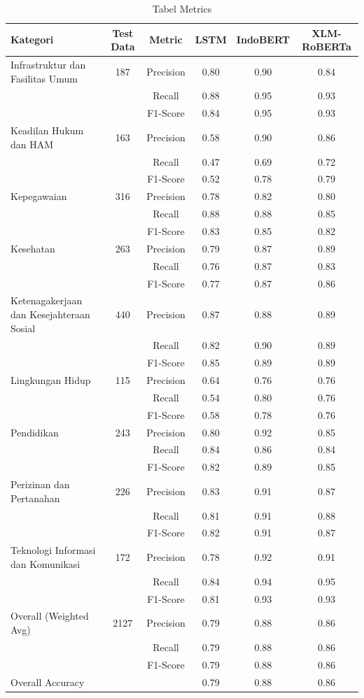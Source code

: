 \documentclass[12pt,a4paper]{article}
\begin{document}
\begin{table}[h!]
\centering
\scriptsize %
\begin{tabular}{|l|c|c|c|c|c|}
\hline
\textbf{Kategori} & \textbf{Test Data} & \textbf{Metric} & \textbf{LSTM} & \textbf{IndoBERT} & \textbf{XLM-RoBERTa} \\ \hline
Infrastruktur dan Fasilitas Umum & 187 & Precision & 0.80 & 0.90 & 0.84 \\ 
 &  & Recall & 0.88 & 0.95 & 0.93 \\ 
 &  & F1-Score & 0.84 & 0.95 & 0.93 \\ \hline
Keadilan Hukum dan HAM & 163 & Precision & 0.58 & 0.90 & 0.86 \\ 
 &  & Recall & 0.47 & 0.69 & 0.72 \\ 
 &  & F1-Score & 0.52 & 0.78 & 0.79 \\ \hline
Kepegawaian & 316 & Precision & 0.78 & 0.82 & 0.80 \\ 
 &  & Recall & 0.88 & 0.88 & 0.85 \\ 
 &  & F1-Score & 0.83 & 0.85 & 0.82 \\ \hline
Kesehatan & 263 & Precision & 0.79 & 0.87 & 0.89 \\ 
 &  & Recall & 0.76 & 0.87 & 0.83 \\ 
 &  & F1-Score & 0.77 & 0.87 & 0.86 \\ \hline
Ketenagakerjaan dan Kesejahteraan Sosial & 440 & Precision & 0.87 & 0.88 & 0.89 \\ 
 &  & Recall & 0.82 & 0.90 & 0.89 \\ 
 &  & F1-Score & 0.85 & 0.89 & 0.89 \\ \hline
Lingkungan Hidup & 115 & Precision & 0.64 & 0.76 & 0.76 \\ 
 &  & Recall & 0.54 & 0.80 & 0.76 \\ 
 &  & F1-Score & 0.58 & 0.78 & 0.76 \\ \hline
Pendidikan & 243 & Precision & 0.80 & 0.92 & 0.85 \\ 
 &  & Recall & 0.84 & 0.86 & 0.84 \\ 
 &  & F1-Score & 0.82 & 0.89 & 0.85 \\ \hline
Perizinan dan Pertanahan & 226 & Precision & 0.83 & 0.91 & 0.87 \\ 
 &  & Recall & 0.81 & 0.91 & 0.88 \\ 
 &  & F1-Score & 0.82 & 0.91 & 0.87 \\ \hline
Teknologi Informasi dan Komunikasi & 172 & Precision & 0.78 & 0.92 & 0.91 \\ 
 &  & Recall & 0.84 & 0.94 & 0.95 \\ 
 &  & F1-Score & 0.81 & 0.93 & 0.93 \\ \hline
Overall (Weighted Avg) & 2127 & Precision & 0.79 & 0.88 & 0.86 \\ 
 &  & Recall & 0.79 & 0.88 & 0.86 \\ 
 &  & F1-Score & 0.79 & 0.88 & 0.86 \\ \hline
Overall Accuracy &  &  & 0.79 & 0.88 & 0.86 \\ \hline
\end{tabular}
\caption{Tabel Metrics}
\end{table}
\end{document}
